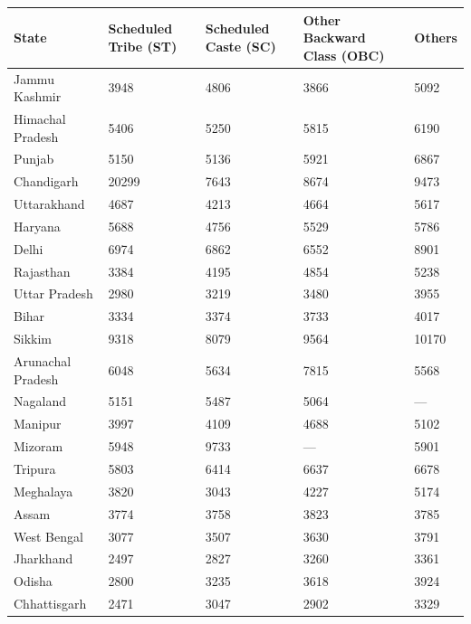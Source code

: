 \documentclass{article}
\begin{document}
		
		\begin{longtable}{|p{4cm}|p{3cm}|p{3cm}|p{3cm}|p{2cm}|}
			\hline
			\textbf{State} & \textbf{Scheduled Tribe (ST)} & \textbf{Scheduled Caste (SC)} & \textbf{Other Backward Class (OBC)} & \textbf{Others} \\ \hline
			\endhead
			
			Jammu  Kashmir    & 3948  & 4806  & 3866  & 5092  \\ \hline
			Himachal Pradesh   & 5406  & 5250  & 5815  & 6190  \\ \hline
			Punjab             & 5150  & 5136  & 5921  & 6867  \\ \hline
			Chandigarh         & 20299 & 7643  & 8674  & 9473  \\ \hline
			Uttarakhand        & 4687  & 4213  & 4664  & 5617  \\ \hline
			Haryana            & 5688  & 4756  & 5529  & 5786  \\ \hline
			Delhi              & 6974  & 6862  & 6552  & 8901  \\ \hline
			Rajasthan          & 3384  & 4195  & 4854  & 5238  \\ \hline
			Uttar Pradesh      & 2980  & 3219  & 3480  & 3955  \\ \hline
			Bihar              & 3334  & 3374  & 3733  & 4017  \\ \hline
			Sikkim             & 9318  & 8079  & 9564  & 10170 \\ \hline
			Arunachal Pradesh  & 6048  & 5634  & 7815  & 5568  \\ \hline
			Nagaland           & 5151  & 5487  & 5064  & ---   \\ \hline
			Manipur            & 3997  & 4109  & 4688  & 5102  \\ \hline
			Mizoram            & 5948  & 9733  & ---   & 5901  \\ \hline
			Tripura            & 5803  & 6414  & 6637  & 6678  \\ \hline
			Meghalaya          & 3820  & 3043  & 4227  & 5174  \\ \hline
			Assam              & 3774  & 3758  & 3823  & 3785  \\ \hline
			West Bengal        & 3077  & 3507  & 3630  & 3791  \\ \hline
			Jharkhand          & 2497  & 2827  & 3260  & 3361  \\ \hline
			Odisha             & 2800  & 3235  & 3618  & 3924  \\ \hline
			Chhattisgarh       & 2471  & 3047  & 2902  & 3329  \\ \hline

\end{longtable}
\end{document}
